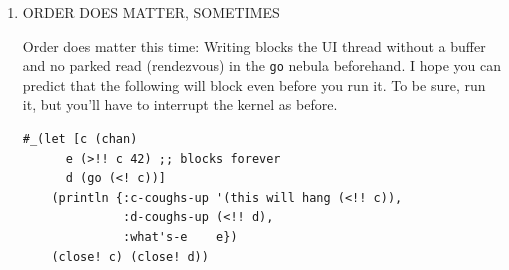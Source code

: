 \documentclass[10pt,oneside,x11names]{article}
\begin{document}
\begin{enumerate}
\begin{verbatim}
(let [c (chan) ;; NO BUFFER!
      d (go (<! c)) ;; park a pseudothread to read c
      e (>!! c 42)  ;; blocking write unparks c's pseudothread
      f '(hangs (>!! c 43))] ;; is `c` closed?
    (println {:c-coughs-up '(hangs (<!! c)),
              :d-coughs-up (<!! d),
              :what's-e    e,
              :what's-f    f})
    (close! c) (close! d))
\end{verbatim}

\begin{verbatim}
{:c-coughs-up (hangs (<!! c)), :d-coughs-up 42, :what's-e true, :what's-f (hangs (>!! c 43))}
\end{verbatim}


StackOverflow reveals a way to find out whether a channel is closed by
peeking under the covers (\url{https://stackoverflow.com/questions/24912971}):

\begin{verbatim}
(let [c (chan) ;; NO BUFFER!
      d (go (<! c)) ;; park a pseudothread to read c
      e (>!! c 42)  ;; blocking write unparks c's pseudothread
      f (clojure.core.async.impl.protocols/closed? c)]
    (println {:c-coughs-up '(hangs (<!! c)),
              :d-coughs-up (<!! d),
              :c-is-open-at-e?  e,
              :c-is-open-at-f?  f})
    (close! c) (close! d))
\end{verbatim}

\begin{verbatim}
{:c-coughs-up (hangs (<!! c)), :d-coughs-up 42, :c-is-open-at-e? true, :c-is-open-at-f? false}
\end{verbatim}

\item ORDER DOES MATTER, SOMETIMES
\label{sec:org9d40b42}

Order does matter this time: Writing blocks the UI thread without a
buffer and no parked read (rendezvous) in the \texttt{go} nebula beforehand. I
hope you can predict that the following will block even before you run
it. To be sure, run it, but you'll have to interrupt the kernel as
before.

\begin{verbatim}
#_(let [c (chan)
      e (>!! c 42) ;; blocks forever
      d (go (<! c))]
    (println {:c-coughs-up '(this will hang (<!! c)),
              :d-coughs-up (<!! d),
              :what's-e    e})
    (close! c) (close! d))
\end{verbatim}
\end{enumerate}
\end{document}
